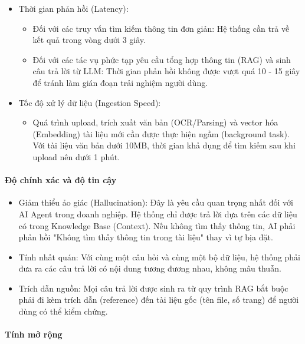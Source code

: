 \begin{itemize}
\item
  Thời gian phản hồi (Latency):

  \begin{itemize}
  \item
    Đối với các truy vấn tìm kiếm thông tin đơn giản: Hệ thống cần trả
    về kết quả trong vòng dưới 3 giây.
  \item
    Đối với các tác vụ phức tạp yêu cầu tổng hợp thông tin (RAG) và sinh
    câu trả lời từ LLM: Thời gian phản hồi không được vượt quá 10 - 15
    giây để tránh làm gián đoạn trải nghiệm người dùng.
  \end{itemize}
\item
  Tốc độ xử lý dữ liệu (Ingestion Speed):

  \begin{itemize}
  \item
    Quá trình upload, trích xuất văn bản (OCR/Parsing) và vector hóa
    (Embedding) tài liệu mới cần được thực hiện ngầm (background task).
    Với tài liệu văn bản dưới 10MB, thời gian khả dụng để tìm kiếm sau
    khi upload nên dưới 1 phút.
  \end{itemize}
\end{itemize}

\paragraph{Độ chính xác và độ tin
cậy}\label{ux111ux1ed9-chuxednh-xuxe1c-vuxe0-ux111ux1ed9-tin-cux1eady}

\begin{itemize}
\item
  Giảm thiểu ảo giác (Hallucination): Đây là yêu cầu quan trọng nhất đối
  với AI Agent trong doanh nghiệp. Hệ thống chỉ được trả lời dựa trên
  các dữ liệu có trong Knowledge Base (Context). Nếu không tìm thấy
  thông tin, AI phải phản hồi "Không tìm thấy thông tin trong tài liệu"
  thay vì tự bịa đặt.
\item
  Tính nhất quán: Với cùng một câu hỏi và cùng một bộ dữ liệu, hệ thống
  phải đưa ra các câu trả lời có nội dung tương đương nhau, không mâu
  thuẫn.
\item
  Trích dẫn nguồn: Mọi câu trả lời được sinh ra từ quy trình RAG bắt
  buộc phải đi kèm trích dẫn (reference) đến tài liệu gốc (tên file, số
  trang) để người dùng có thể kiểm chứng.
\end{itemize}

\paragraph{Tính mở rộng}\label{tuxednh-mux1edf-rux1ed9ng}


